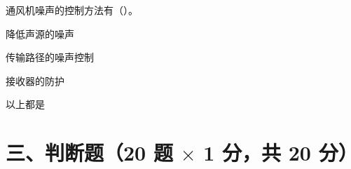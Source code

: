 \begin{ti}
\item 通风机噪声的控制方法有（\quad）。
\begin{choices}
\item 降低声源的噪声
\item 传输路径的噪声控制
\item 接收器的防护
\item 以上都是
\end{choices}

\end{ti}

\section*{三、判断题（20 题 $\times$ 1 分，共 20 分）}

